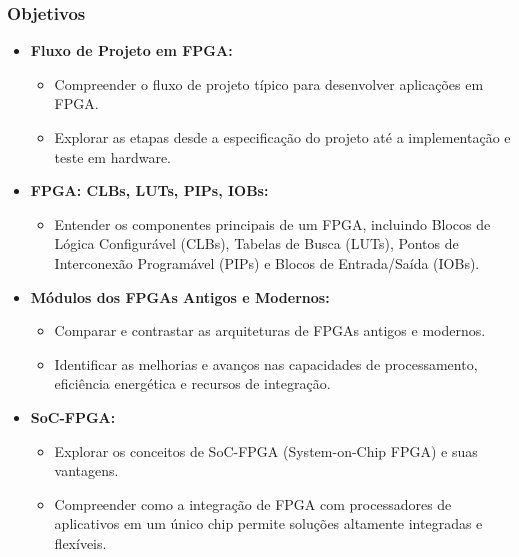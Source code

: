 \documentclass[aspectratio=169]{beamer}
\begin{document}
\begin{frame}
	\frametitle{Objetivos}
	
	\begin{itemize}
		\item \textbf{Fluxo de Projeto em FPGA:}
		\begin{itemize}
			\item Compreender o fluxo de projeto típico para desenvolver aplicações em FPGA.
			\item Explorar as etapas desde a especificação do projeto até a implementação e teste em hardware.
		\end{itemize}
		
		\item \textbf{FPGA: CLBs, LUTs, PIPs, IOBs:}
		\begin{itemize}
			\item Entender os componentes principais de um FPGA, incluindo Blocos de Lógica Configurável (CLBs), Tabelas de Busca (LUTs), Pontos de Interconexão Programável (PIPs) e Blocos de Entrada/Saída (IOBs).
		\end{itemize}
		
		\item \textbf{Módulos dos FPGAs Antigos e Modernos:}
		\begin{itemize}
			\item Comparar e contrastar as arquiteturas de FPGAs antigos e modernos.
			\item Identificar as melhorias e avanços nas capacidades de processamento, eficiência energética e recursos de integração.
		\end{itemize}
		
		\item \textbf{SoC-FPGA:}
		\begin{itemize}
			\item Explorar os conceitos de SoC-FPGA (System-on-Chip FPGA) e suas vantagens.
			\item Compreender como a integração de FPGA com processadores de aplicativos em um único chip permite soluções altamente integradas e flexíveis.
		\end{itemize}
	\end{itemize}


\end{frame}










\end{document}
